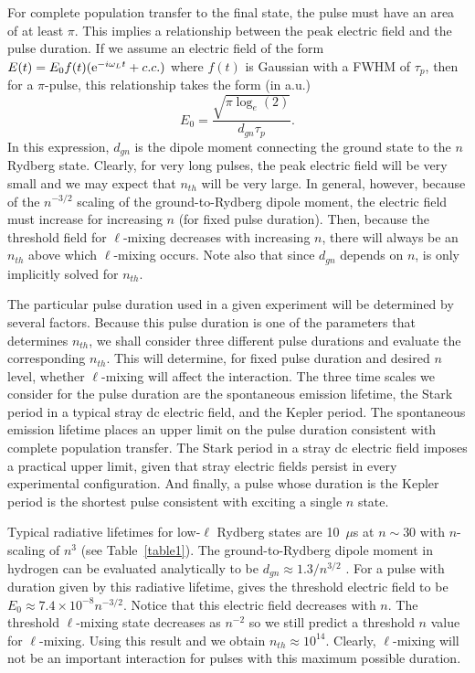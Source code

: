 For complete population transfer to the final state, the pulse must have an area
of at least $\pi$.  This implies a relationship between the peak electric field
and the pulse duration.  If we assume an electric field of the form $E(t) = E_0
f(t) ({\rm e}^{-i\omega_L t} + c.c.)$ where $f(t)$ is Gaussian with a FWHM of
$\tau_p$, then for a $\pi$-pulse, this relationship takes the form (in a.u.)
\begin{equation}
E_0 = \frac{\sqrt{\pi \log_e(2)}}{d_{gn} \tau_p}.
\label{pi_pulse}
\end{equation} 
In this expression, $d_{gn}$ is the dipole moment connecting the ground state 
to the $n$ Rydberg state.   Clearly, for very long pulses, the peak electric
field will be very small and we may expect that $n_{th}$ will be very
large.  In general, however, because of the $n^{-3/2}$ scaling of the
ground-to-Rydberg dipole moment, the electric field must increase for
increasing $n$ (for fixed pulse duration).  Then, because the threshold field for
$\ell$-mixing decreases with increasing $n$, there will always be an $n_{th}$
above which $\ell$-mixing occurs.  Note also that since $d_{gn}$ depends on $n$,
 is only implicitly solved for $n_{th}$.

The particular pulse duration used in a given experiment will be determined by
several factors.  Because this pulse duration is one of the parameters that
determines $n_{th}$, we shall consider three different pulse
durations and evaluate the corresponding $n_{th}$.  This will determine, for
fixed pulse duration and desired $n$ level, whether $\ell$-mixing will affect
the interaction.  The three time scales we consider for the pulse duration are 
the spontaneous emission lifetime, the Stark period in a typical stray dc
electric field, and the Kepler period.  The spontaneous emission lifetime places
an upper limit on the pulse duration consistent with complete population
transfer.  The Stark period in a stray dc electric field imposes a practical
upper limit, given that stray electric fields persist in every experimental
configuration.  And finally, a pulse whose duration is the Kepler period is the
shortest pulse consistent with exciting a single $n$ state.

Typical radiative lifetimes for low-$\ell$ Rydberg states are 10~$\mu$s at $n
\sim 30$ with $n$-scaling of $n^3$ (see Table~\ref{table1}).  The
ground-to-Rydberg dipole moment in hydrogen can be evaluated analytically to be
$d_{gn} \approx 1.3/n^{3/2}$ \cite{Bethe_Salpeter}.  For a pulse with
duration given by this radiative lifetime,  gives the threshold
electric field to be $E_0 \approx 7.4 \times 10^{-8} n^{-3/2}$.  Notice that this
electric field decreases with $n$. The threshold $\ell$-mixing state decreases
as $n^{-2}$ so we still predict a threshold $n$ value for $\ell$-mixing.  Using
this result and  we obtain
$n_{th} \approx 10^{14}$.  Clearly, $\ell$-mixing will not be an important
interaction for pulses with this maximum possible duration.

